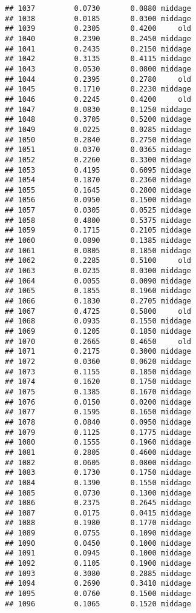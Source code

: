 \documentclass[
]{article}
\begin{document}
\begin{verbatim}
## 1037         0.0730       0.0880 middage
## 1038         0.0185       0.0300 middage
## 1039         0.2305       0.4200     old
## 1040         0.2390       0.2450 middage
## 1041         0.2435       0.2150 middage
## 1042         0.3135       0.4115 middage
## 1043         0.0530       0.0800 middage
## 1044         0.2395       0.2780     old
## 1045         0.1710       0.2230 middage
## 1046         0.2245       0.4200     old
## 1047         0.0830       0.1250 middage
## 1048         0.3705       0.5200 middage
## 1049         0.0225       0.0285 middage
## 1050         0.2840       0.2750 middage
## 1051         0.0370       0.0365 middage
## 1052         0.2260       0.3300 middage
## 1053         0.4195       0.6095 middage
## 1054         0.1870       0.2360 middage
## 1055         0.1645       0.2800 middage
## 1056         0.0950       0.1500 middage
## 1057         0.0305       0.0525 middage
## 1058         0.4800       0.5375 middage
## 1059         0.1715       0.2105 middage
## 1060         0.0890       0.1385 middage
## 1061         0.0805       0.1850 middage
## 1062         0.2285       0.5100     old
## 1063         0.0235       0.0300 middage
## 1064         0.0055       0.0090 middage
## 1065         0.1855       0.1960 middage
## 1066         0.1830       0.2705 middage
## 1067         0.4725       0.5800     old
## 1068         0.0935       0.1550 middage
## 1069         0.1205       0.1850 middage
## 1070         0.2665       0.4650     old
## 1071         0.2175       0.3000 middage
## 1072         0.0360       0.0620 middage
## 1073         0.1155       0.1850 middage
## 1074         0.1620       0.1750 middage
## 1075         0.1385       0.1670 middage
## 1076         0.0150       0.0200 middage
## 1077         0.1595       0.1650 middage
## 1078         0.0840       0.0950 middage
## 1079         0.1125       0.1775 middage
## 1080         0.1555       0.1960 middage
## 1081         0.2805       0.4600 middage
## 1082         0.0605       0.0800 middage
## 1083         0.1730       0.1750 middage
## 1084         0.1390       0.1550 middage
## 1085         0.0730       0.1300 middage
## 1086         0.2375       0.2645 middage
## 1087         0.0175       0.0415 middage
## 1088         0.1980       0.1770 middage
## 1089         0.0755       0.1090 middage
## 1090         0.0450       0.1000 middage
## 1091         0.0945       0.1000 middage
## 1092         0.1105       0.1900 middage
## 1093         0.3080       0.2885 middage
## 1094         0.2690       0.3410 middage
## 1095         0.0760       0.1500 middage
## 1096         0.1065       0.1520 middage

\end{verbatim}
\end{document}
